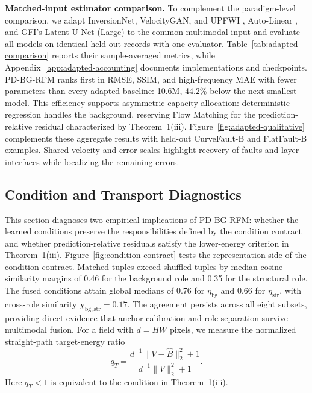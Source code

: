 \documentclass[letterpaper]{article}
\begin{document}
\textbf{Matched-input estimator comparison.} To complement the paradigm-level comparison, we adapt InversionNet, VelocityGAN, and UPFWI \cite{deng2022openfwi}, Auto-Linear \cite{feng2024autolinear}, and GFI's Latent U-Net (Large) \cite{gupta2025gfi} to the common multimodal input and evaluate all models on identical held-out records with one evaluator. Table~\ref{tab:adapted-comparison} reports their sample-averaged metrics, while Appendix~\ref{app:adapted-accounting} documents implementations and checkpoints. PD-BG-RFM ranks first in RMSE, SSIM, and high-frequency MAE with fewer parameters than every adapted baseline: 10.6M, 44.2\% below the next-smallest model. This efficiency supports asymmetric capacity allocation: deterministic regression handles the background, reserving Flow Matching for the prediction-relative residual characterized by Theorem~1(iii). Figure~\ref{fig:adapted-qualitative} complements these aggregate results with held-out CurveFault-B and FlatFault-B examples. Shared velocity and error scales highlight recovery of faults and layer interfaces while localizing the remaining errors.

\subsection{Condition and Transport Diagnostics}



This section diagnoses two empirical implications of PD-BG-RFM: whether the learned conditions preserve the responsibilities defined by the condition contract and whether prediction-relative residuals satisfy the lower-energy criterion in Theorem~1(iii).
Figure~\ref{fig:condition-contract} tests the representation side of the condition contract. Matched tuples exceed shuffled tuples by median cosine-similarity margins of 0.46 for the background role and 0.35 for the structural role. The fused conditions attain global medians of 0.76 for $\eta_{\mathrm{bg}}$ and 0.66 for $\eta_{\mathrm{str}}$, with cross-role similarity $\chi_{\mathrm{bg,str}}=0.17$. The agreement persists across all eight subsets, providing direct evidence that anchor calibration and role separation survive multimodal fusion.
For a field with $d=HW$ pixels, we measure the normalized straight-path target-energy ratio
\begin{equation}
q_T=\frac{d^{-1}\|V-\hat B\|_2^2+1}{d^{-1}\|V\|_2^2+1}.
\label{eq:transport-diagnostic}
\end{equation}
Here $q_T<1$ is equivalent to the condition in Theorem~1(iii).
\end{document}
